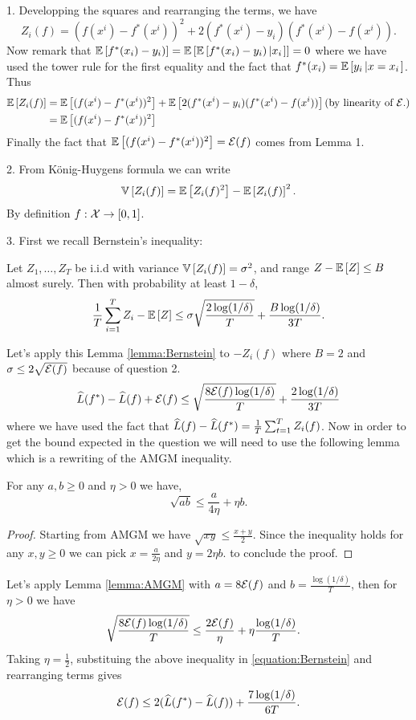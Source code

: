 \begin{solution}[]
1. Developping the squares and rearranging the terms, we have
   \[Z_i(f) = (f(x^i)-f^*(x^i))^2 +2(f^*(x^i)-y_i)(f^*(x^i)-f(x^i)).\] 
 Now remark that $\mathbb{E}\left[f^*(x_i)-y_i)\right]= \mathbb{E}\left[\mathbb{E}\left[f^*(x_i)-y_i)\left|x_i\right.\right]\right] = 0$ 
 where we have used the tower rule for the first equality and the fact that $f^*(x_i)=\mathbb{E}\left[y_i\left|x=x_i\right.\right]$.
Thus
\begin{align*}
    \mathbb{E}\left[Z_i(f)\right] &= \mathbb{E}\left[(f(x^i)-f^*(x^i))^2\right] + \mathbb{E}\left[2(f^*(x^i)-y_i)(f^*(x^i)-f(x^i))\right] \text{(by linearity of $\mathcal{E}{.}$)} \\
                &= \mathbb{E}\left[(f(x^i)-f^*(x^i))^2\right]
\end{align*}
Finally the fact that $\mathbb{E}\left[(f(x^i)-f^*(x^i))^2\right]= \mathcal{E}(f)$ comes from Lemma 1.

2. From König-Huygens formula we can write 
\[ \mathbb{V}\left[Z_i(f)\right]=\mathbb{E}\left[Z_i(f)^2\right]-\mathbb{E}\left[Z_i(f)\right]^2.\] 
By definition $f : \mathcal{X} \to [0,1]$.


3. First we recall Bernstein's inequality:
\begin{lemma}
    \label{lemma:Bernstein}
    Let $Z_1,\ldots,Z_T$ be i.i.d with variance $\mathbb{V}\left[Z_i(f)\right]=\sigma^2$, and range $Z-\mathbb{E}\left[Z\right]\leq B$ almost surely.
    Then with probability at least $1-\delta$,
    \[ \frac{1}{T}\sum_{i=1}^{T}Z_i -\mathbb{E}\left[Z\right]\leq \sigma\sqrt{\frac{2\log(1/\delta)}{T}}+\frac{B\log(1/\delta)}{3T}.\]
\end{lemma}
Let's apply this Lemma \ref{lemma:Bernstein} to $-Z_i(f)$ where $B= 2$ and $\sigma \leq 2\sqrt{\mathcal{E}(f)}$ because of question 2.    
\begin{equation}
    \label{equation:Bernstein}
    \widehat L(f^*)- \widehat L(f) + \mathcal{E}(f) \leq \sqrt{\frac{8\mathcal{E}(f)\log(1/\delta)}{T}}+\frac{2\log(1/\delta)}{3T}
\end{equation}
where we have used the fact that $\widehat L(f)-\widehat L(f^*) = \frac{1}{T}\sum_{t=1}^{T}Z_i(f)$.
Now in order to get the bound expected in the question we will need to use the following lemma which is a rewriting of the AMGM inequality.
\begin{lemma}
    \label{lemma:AMGM}
  For any $a,b\geq 0$ and $\eta >0$ we have,
  \[ \sqrt{ab} \leq \frac{a}{4\eta} +\eta b.\] 
\end{lemma}
\begin{proof}
    Starting from AMGM we have $\sqrt{xy} \leq \frac{x+y}{2}$.
    Since the inequality holds for any $x,y \geq 0$ we can pick $x = \frac{a}{2\eta}$ and $y=2\eta b$.
    to conclude the proof.
\end{proof}
Let's apply Lemma \ref{lemma:AMGM} with $a=8\mathcal{E}(f)$ and $b=\frac{\log(1/\delta)}{T}$, then for $\eta>0$ we have
\begin{align*}
    \sqrt{\frac{8\mathcal{E}(f)\log(1/\delta)}{T}}&\leq \frac{2\mathcal{E}(f)}{\eta} + \eta \frac{\log(1/\delta)}{T}.
\end{align*}
Taking $\eta=\frac{1}{2}$, substituing the above inequality in \ref{equation:Bernstein} and rearranging terms gives
\[ \mathcal{E}(f) \leq 2( \widehat L(f^*)- \widehat L(f))+\frac{7\log(1/\delta)}{6T}.\]


\end{solution}
